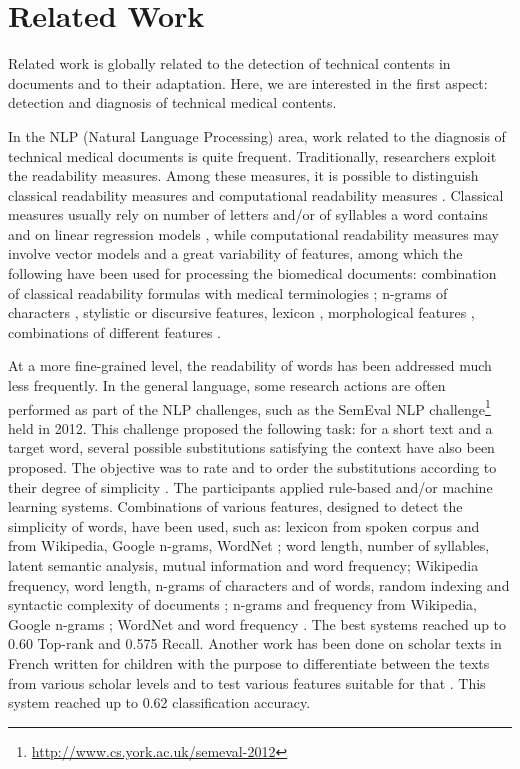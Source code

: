 \chapter{Related Work}
\label{ch:related-work}

Related work is globally related to the detection of technical contents in documents and to their adaptation. Here, we are interested in the first aspect: detection and diagnosis of technical medical contents. 

In the NLP (Natural Language Processing) area, work related to the diagnosis of technical medical documents is quite frequent. Traditionally, researchers exploit the readability measures. Among these measures, it is possible to distinguish classical readability measures and computational readability measures \citep{Francois-TAL2013}. Classical measures usually rely on number of letters and/or of syllables a word contains and on linear regression models \citep{Flesch1948,Gunning1973}, while computational readability
measures may involve vector models and a great variability of
features, among which the following have been used for processing the
biomedical documents: combination of classical readability formulas
with medical terminologies \citep{Kokkinakis-2006}; n-grams of
characters \citep{Poprat-MIE2006}, stylistic \citep{Grabar-AMIA2007} or
discursive \citep{Goeuriot-LREC2008} features, lexicon
\citep{Miller-HICSS2007}, morphological features
\citep{Chmielik-TAL2011}, combinations of different features
\citep{Zeng-MEDINFO2007}.

At a more fine-grained level, the readability of words has been
addressed much less frequently. In the general language, some research
actions are often performed as part of the NLP challenges, such as the
SemEval NLP challenge\footnote{\url{http://www.cs.york.ac.uk/semeval-2012}} held
in 2012. This challenge proposed the following task: for a short text
and a target word, several possible substitutions satisfying the
context have also been proposed. The objective was to rate and to
order the substitutions according to their degree of simplicity
\citep{specia-SEMEVAL2012}. The participants applied rule-based and/or
machine learning systems. Combinations of various features, designed
to detect the simplicity of words, have been used, such as: lexicon
from spoken corpus and from Wikipedia, Google n-grams, WordNet
\citep{sinha-SEMEVAL2012}; word length, number of syllables, latent
semantic analysis, mutual information and word
frequency\citep{jauhar-SEMEVAL2012}; Wikipedia frequency, word length,
n-grams of characters and of words, random indexing and syntactic
complexity of documents \citep{johannsen-SEMEVAL2012}; n-grams and
frequency from Wikipedia, Google n-grams \citep{ligozat-SEMEVAL2012};
WordNet and word frequency \citep{amoia-SEMEVAL2012}. The best systems
reached up to 0.60 Top-rank and 0.575 Recall.
Another work has been done on scholar texts in French written for
children with the purpose to differentiate between the texts from
various scholar levels and to test various features suitable for that
\citep{Gala-ELEX2013}. This system reached up to 0.62 classification
accuracy.

